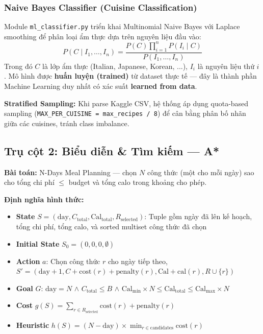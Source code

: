 \subsubsection{Naive Bayes Classifier (Cuisine Classification)}
Module \texttt{ml\_classifier.py} triển khai Multinomial Naive Bayes với Laplace smoothing để phân loại ẩm thực dựa trên nguyên liệu đầu vào:
\begin{equation}
P(C \mid I_1, \ldots, I_n) = \frac{P(C) \prod_{i=1}^{n} P(I_i \mid C)}{P(I_1, \ldots, I_n)}
\end{equation}
Trong đó $C$ là lớp ẩm thực (Italian, Japanese, Korean, ...), $I_i$ là nguyên liệu thứ $i$. Mô hình được \textbf{huấn luyện (trained)} từ dataset thực tế --- đây là thành phần Machine Learning duy nhất có xác suất \textbf{learned from data}.

\textbf{Stratified Sampling:} Khi parse Kaggle CSV, hệ thống áp dụng quota-based sampling (\texttt{MAX\_PER\_CUISINE = max\_recipes / 8}) để cân bằng phân bố nhãn giữa các cuisines, tránh class imbalance.

\subsection{Trụ cột 2: Biểu diễn \& Tìm kiếm --- A*}
\label{sec:search}

\textbf{Bài toán:} N-Days Meal Planning --- chọn $N$ công thức (một cho mỗi ngày) sao cho tổng chi phí $\leq$ budget và tổng calo trong khoảng cho phép.

\textbf{Định nghĩa hình thức:}
\begin{itemize}
  \item \textbf{State} $S = (\text{day}, C_{\text{total}}, \text{Cal}_{\text{total}}, R_{\text{selected}})$: Tuple gồm ngày đã lên kế hoạch, tổng chi phí, tổng calo, và sorted multiset công thức đã chọn
  \item \textbf{Initial State} $S_0 = (0, 0, 0, \emptyset)$
  \item \textbf{Action} $a$: Chọn công thức $r$ cho ngày tiếp theo, $S' = (\text{day}+1, C + \text{cost}(r) + \text{penalty}(r), \text{Cal} + \text{cal}(r), R \cup \{r\})$
  \item \textbf{Goal} $G$: $\text{day} = N$ $\wedge$ $C_{\text{total}} \leq B$ $\wedge$ $\text{Cal}_{\min} \times N \leq \text{Cal}_{\text{total}} \leq \text{Cal}_{\max} \times N$
  \item \textbf{Cost} $g(S) = \sum_{r \in R_{\text{selected}}} \text{cost}(r) + \text{penalty}(r)$
  \item \textbf{Heuristic} $h(S) = (N - \text{day}) \times \min_{r \in \text{candidates}} \text{cost}(r)$
\end{itemize}

